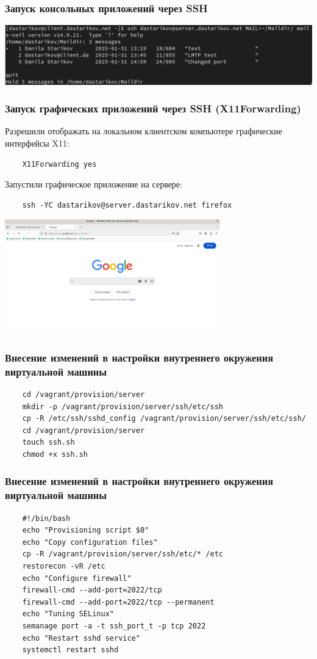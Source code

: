 \begin{frame}
\frametitle{Запуск консольных приложений через SSH}
  \centering
  \includegraphics[width=\textwidth]{../images/image15.png}
\end{frame}

\begin{frame}[fragile]
\frametitle{Запуск графических приложений через SSH (X11Forwarding)}
Разрешили отображать на локальном клиентском компьютере графические интерфейсы X11:
  \begin{verbatim}
    X11Forwarding yes
  \end{verbatim}
Запустили графическое приложение на сервере:
  \begin{verbatim}
    ssh -YC dastarikov@server.dastarikov.net firefox
  \end{verbatim}
  \centering
  \includegraphics[width=0.7\textwidth]{../images/image16.png}
\end{frame}

\begin{frame}[fragile]
\frametitle{Внесение изменений в настройки внутреннего окружения виртуальной машины}
  \begin{verbatim}
    cd /vagrant/provision/server
    mkdir -p /vagrant/provision/server/ssh/etc/ssh
    cp -R /etc/ssh/sshd_config /vagrant/provision/server/ssh/etc/ssh/
    cd /vagrant/provision/server
    touch ssh.sh
    chmod +x ssh.sh
  \end{verbatim}
\end{frame}

\begin{frame}[fragile]
\frametitle{Внесение изменений в настройки внутреннего окружения виртуальной машины}
  \begin{verbatim}
    #!/bin/bash
    echo "Provisioning script $0"
    echo "Copy configuration files"
    cp -R /vagrant/provision/server/ssh/etc/* /etc
    restorecon -vR /etc
    echo "Configure firewall"
    firewall-cmd --add-port=2022/tcp
    firewall-cmd --add-port=2022/tcp --permanent
    echo "Tuning SELinux"
    semanage port -a -t ssh_port_t -p tcp 2022
    echo "Restart sshd service"
    systemctl restart sshd
  \end{verbatim}
\end{frame}



